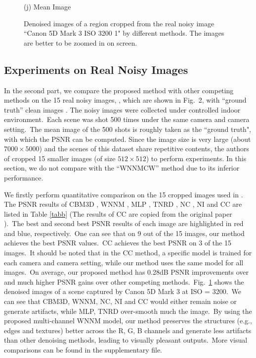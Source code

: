 \documentclass[10pt,twocolumn,letterpaper,sort&compress]{article}
\begin{document}
\begin{figure}
{\begin{minipage}[t]{0.195\textwidth}
{\footnotesize (j) Mean Image \cite{crosschannel2016}}
\end{minipage}
}\vspace{-0.5mm}
\caption{Denoised images of a region cropped from the real noisy image ``Canon 5D Mark 3 ISO 3200 1" \cite{crosschannel2016} by different methods. The images are better to be zoomed in on screen.}
\label{fig7}
\vspace{0.5mm}
\end{figure}

\subsection{Experiments on Real Noisy Images}
In the second part, we compare the proposed method with other competing methods on the 15 real noisy images, , which are shown in Fig.\ 2, with ``ground truth'' clean images \cite{crosschannel2016}. The noisy images were collected under controlled indoor environment.\ Each scene was shot 500 times under the same camera and camera setting.\ The mean image of the 500 shots is roughly taken as the ``ground truth", with which the PSNR can be computed. Since the image size is very large (about $7000\times5000$) and the scenes of this dataset share repetitive contents, the authors of \cite{crosschannel2016} cropped 15 smaller images (of size $512\times512$) to perform experiments. In this section, we do not compare with the ``WNNMCW'' method due to its inferior performance.

We firstly perform quantitative comparison on the 15 cropped images used in \cite{crosschannel2016}. The PSNR results of CBM3D \cite{bm3d}, WNNM \cite{wnnm}, MLP \cite{mlp}, TNRD \cite{chen2015learning}, NC \cite{noiseclinic,ncwebsite}, NI \cite{neatimage} and
CC \cite{crosschannel2016} are listed in Table \ref{tabb} (The results of CC are copied from the original paper \cite{crosschannel2016}).\ The best and second best PSNR results of each image are highlighted in red and blue, respectively.\ One can see that on 9 out of the 15 images, our method achieves the best PSNR values.\ CC achieves the best PSNR on 3 of the 15 images.\ It should be noted that in the CC method, a specific model is trained for each camera and camera setting, while our method uses the same model for all images.\ On average, our proposed method has 0.28dB PSNR improvements over \cite{crosschannel2016} and much higher PSNR gains over other competing methods.\ Fig.\ \ref{fig7} shows the denoised images of a scene captured by Canon 5D Mark 3 at ISO = 3200.\ We can see that CBM3D, WNNM, NC, NI and CC would either remain noise or generate artifacts, while MLP, TNRD over-smooth much the image.\ By using the proposed multi-channel WNNM model, our method preserves the structures (e.g., edges and textures) better across the R, G, B channels and generate less artifacts than other denoising methods, leading to visually pleasant outputs.\ More visual comparisons can be found in the supplementary file.
\end{document}
